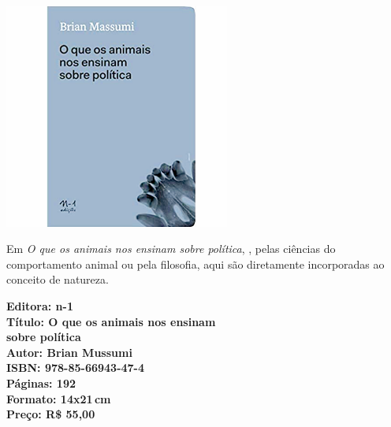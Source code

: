\pagebreak

\begin{center}
\hspace*{.5cm}\includegraphics[width=74mm]{./CAPAS/N-1_ANIMAIS.jpg}
\end{center}

\hspace*{-7cm}\hrulefill\hspace*{-7cm}

\medskip

\noindent{} Em \textit{O que os animais nos ensinam sobre política}, , pelas ciências do comportamento animal ou pela filosofia, aqui são diretamente incorporadas ao conceito de natureza.

\vfill

\hspace*{-.4cm}\begin{minipage}[c]{.5\linewidth}
\small\textbf{
\hspace*{-.1cm}Editora: n-1\\
Título: O que os animais nos ensinam\\sobre política\\
Autor: Brian Mussumi\\
ISBN: 978-85-66943-47-4\\
Páginas: 192\\
Formato: 14x21\,cm\\
Preço: R\$ 55,00\\
}
\end{minipage}

\pagebreak

